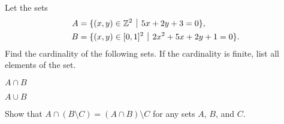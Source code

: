 \begin{problem}
    Let the sets
    \begin{align*}
        A &= \{(x,y) \in \Z^2 \vert 5x+2y+3=0\},\\
        B &= \{(x,y) \in [0,1]^2 \vert 2x^2+5x+2y+1=0\}.
    \end{align*}
    Find the cardinality of the following sets. If the cardinality is finite, list all elements of the set.
    \begin{partquestions}{\alph*}
        \item $A \cap B$
        \item $A \cup B$
    \end{partquestions}
\end{problem}

\begin{problem}
    Show that $A \cap (B \setminus C) = (A \cap B) \setminus C$ for any sets $A$, $B$, and $C$.
\end{problem}
